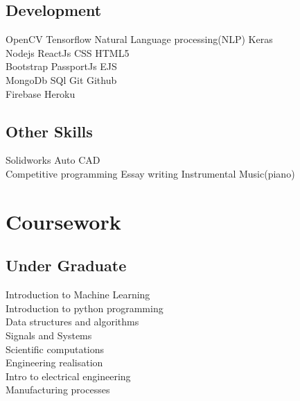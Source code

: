 \documentclass[]{deedy-resume-openfont}
\begin{document}
\begin{minipage}[t]{0.33\textwidth}
\subsection{Development}

\textbullet{} OpenCV \textbullet{} Tensorflow \textbullet{} Natural Language processing(NLP) \textbullet{} Keras \\
\textbullet{} Nodejs \textbullet{} ReactJs  \textbullet{} CSS 
\textbullet{} HTML5 \\ \textbullet{} Bootstrap \textbullet{} PassportJs\textbullet{} EJS  \\
\textbullet{} MongoDb \textbullet{} SQl \textbullet{} Git \textbullet{} Github \\ \textbullet{} Firebase \textbullet{} Heroku  \\
\sectionsep
\subsection{Other Skills}

\textbullet{} Solidworks \textbullet{}Auto CAD \\  \textbullet{} 
Competitive programming \textbullet{} Essay writing \textbullet{} Instrumental Music(piano)\\
\sectionsep





\section{Coursework}

\subsection{Under Graduate}
\textbullet{}Introduction to  Machine Learning \\
\textbullet{}Introduction to python programming\\
\textbullet{}Data structures and algorithms \\
\textbullet{}Signals and Systems\\
\textbullet{}Scientific computations\\
\textbullet{}Engineering realisation \\
\textbullet{}Intro to electrical engineering \\
\textbullet{}Manufacturing processes\\
\sectionsep

\end{minipage}
\end{document}
